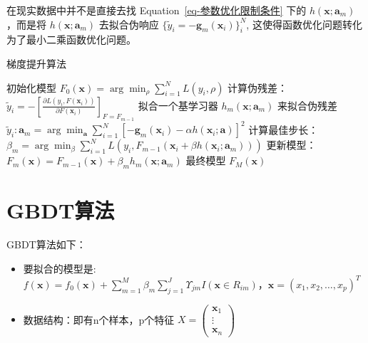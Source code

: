 \documentclass[
  letterpaper,
  DIV=11,
  numbers=noendperiod]{scrartcl}
\providecommand{\tightlist}{%
  \setlength{\itemsep}{0pt}\setlength{\parskip}{0pt}}\usepackage{longtable,booktabs,array}
\begin{document}
在现实数据中并不是直接去找 Equation~\ref{eq-参数优化限制条件} 下的
\(h(\mathbf x;\mathbf a_m)\) ，而是将 \(h(\mathbf x;\mathbf a_m)\)
去拟合伪响应 \(\{\tilde{y}_i=-\mathbf g_m(\mathbf x_i)\}_i^N\),
这使得函数优化问题转化为了最小二乘函数优化问题。

\begin{algorithm}[H]
\caption{梯度提升算法}
\begin{algorithmic}[1]
\State 初始化模型 $F_0(\mathbf{x}) = \arg\min_{\rho} \sum_{i=1}^N L(y_i, \rho)$
    \State 计算伪残差：$\tilde y_i = -\left[\frac{\partial L(y_i, F(\mathbf{x}_i))}{\partial F(\mathbf{x}_i)}\right]_{F=F_{m-1}}$
    \State 拟合一个基学习器 $h_m(\mathbf{x};\mathbf a_m)$ 来拟合伪残差 $\tilde y_i:\mathbf a_m=\arg\min_{\mathbf a}\sum_{i=1}^N[-\mathbf g_m(\mathbf x_i)-\alpha h(\mathbf x_i;\mathbf a)]^2$
    \State 计算最佳步长：$\beta_m=\arg\min_{\beta}\sum_{i=1}^NL(y_i,F_{m-1}(\mathbf x_i+\beta h(\mathbf x_i;\mathbf a_m)))$
    \State 更新模型：$F_m(\mathbf{x}) = F_{m-1}(\mathbf{x}) + \beta_m h_m(\mathbf{x};\mathbf a_m)$
\EndFor
\State \Return 最终模型 $F_M(\mathbf{x})$
\end{algorithmic}
\end{algorithm}

\section{GBDT算法}\label{gbdtux7b97ux6cd5}

GBDT算法如下：

\begin{itemize}
\tightlist
\item
  要拟合的模型是:
  \(f(\mathbf{x})=f_0(\mathbf{x})+\sum_{m=1}^M\beta_m\sum_{j=1}^J\Upsilon_{jm}I(\mathbf{x}\in R_{im})，\mathbf{x}=(x_1,x_2,\ldots,x_p)^T\)
\item
  数据结构：即有n个样本，p个特征
  \(X=\begin{pmatrix}\mathbf{x}_1\\\vdots\\\mathbf{x}_n\end{pmatrix}\)
\end{itemize}
\end{document}
